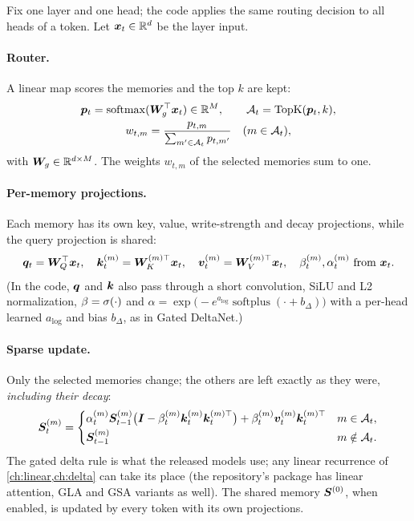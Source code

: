 Fix one layer and one head; the code applies the same routing decision to all heads of a
token. Let $\bm{x}_t\in\mathbb{R}^d$ be the layer input.

\paragraph{Router.} A linear map scores the memories and the top $k$ are kept:
\begin{equation}\label{eq:c07-mom-router}
  \begin{gathered}
  \bm{p}_t = \operatorname{softmax}(\bm{W}_g^{\top}\bm{x}_t) \in \mathbb{R}^{M},\qquad
  \mathcal{A}_t = \operatorname{TopK}(\bm{p}_t, k),\\
  w_{t,m} = \frac{p_{t,m}}{\sum_{m'\in\mathcal{A}_t} p_{t,m'}}\quad (m\in\mathcal{A}_t),
  \end{gathered}
\end{equation}
with $\bm{W}_g\in\mathbb{R}^{d\times M}$. The weights $w_{t,m}$ of the selected memories sum to one.

\paragraph{Per-memory projections.} Each memory has its own key, value, write-strength and
decay projections, while the query projection is shared:
\begin{equation}\label{eq:c07-mom-proj}
  \bm{q}_t = \bm{W}_Q^{\top}\bm{x}_t,\quad \bm{k}_t^{(m)} = \bm{W}_K^{(m)\top}\bm{x}_t,\quad
  \bm{v}_t^{(m)} = \bm{W}_V^{(m)\top}\bm{x}_t,\quad \beta_t^{(m)}, \alpha_t^{(m)} \text{ from } \bm{x}_t .
\end{equation}
(In the code, $\bm{q}$ and $\bm{k}$ also pass through a short convolution, SiLU and L2
normalization, $\beta = \sigma(\cdot)$ and
$\alpha = \exp\bigl(-e^{a_{\log}}\operatorname{softplus}(\cdot + b_\Delta)\bigr)$ with a per-head
learned $a_{\log}$ and bias $b_\Delta$, as in Gated DeltaNet.)

\paragraph{Sparse update.} Only the selected memories change; the others are left exactly as
they were, \emph{including their decay}:
\begin{equation}\label{eq:c07-mom-update}
  \bm{S}_t^{(m)} = \begin{cases}
   \alpha_t^{(m)}\bm{S}_{t-1}^{(m)}\bigl(\bm{I} - \beta_t^{(m)}\bm{k}_t^{(m)}\bm{k}_t^{(m)\top}\bigr) + \beta_t^{(m)}\bm{v}_t^{(m)}\bm{k}_t^{(m)\top} & m\in\mathcal{A}_t,\\[2pt]
   \bm{S}_{t-1}^{(m)} & m \notin \mathcal{A}_t .
  \end{cases}
\end{equation}
The gated delta rule is what the released models use; any linear recurrence of
\cref{ch:linear,ch:delta} can take its place (the repository's  package has
linear attention, GLA and GSA variants as well). The shared memory $\bm{S}^{(0)}$, when
enabled, is updated by every token with its own projections.

